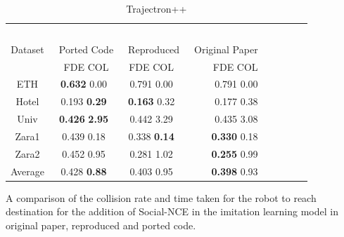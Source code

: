 \begin{table}[H]
\caption{Trajectron++} %
\centering %
\begin{tabular}{ccc rrrrr} 
\hline 
&\ \ \ \ \ \\
Dataset&\ Ported Code&\ Reproduced&\ Original Paper&\ \\ [0.5ex]
&\ FDE \hspace{0.25cm} COL&   FDE \hspace{0.25cm} COL& FDE \hspace{0.25cm} COL\\  
\hline 
ETH &    {\bf{0.632}} \hspace{0.25cm} 0.00 & 0.791 \hspace{0.25cm} 0.00 & 0.791 \hspace{0.25cm} 0.00\\
Hotel&   0.193 \hspace{0.25cm} {\bf{0.29}} & {\bf{0.163}} \hspace{0.25cm} 0.32 & 0.177 \hspace{0.25cm} 0.38\\
Univ &   {\bf{0.426}} \hspace{0.25cm} {\bf{2.95}} & 0.442 \hspace{0.25cm} 3.29 & 0.435 \hspace{0.25cm} 3.08\\
Zara1&   0.439 \hspace{0.25cm} 0.18 & 0.338 \hspace{0.25cm} {\bf{0.14}} & {\bf{0.330}} \hspace{0.25cm} 0.18\\  
Zara2&   0.452 \hspace{0.25cm} 0.95 & 0.281 \hspace{0.25cm} 1.02 & {\bf{0.255}} \hspace{0.25cm} 0.99\\
\hline
Average& 0.428 \hspace{0.25cm} {\bf{0.88}} & 0.403 \hspace{0.25cm} 0.95 & {\bf{0.398}} \hspace{0.25cm} 0.93\\

\hline %
\end{tabular}
\label{tab:hresult}
\end{table}

A comparison of the collision rate and time taken for the robot to reach destination for the addition of Social-NCE in the imitation learning model in original paper, reproduced and ported code.

